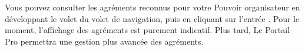 Vous pouvez consulter les agréments reconnus pour votre Pouvoir organisateur en développant le volet  du volet de navigation, puis en cliquant sur l'entrée . Pour le moment, l'affichage des agréments est purement indicatif. Plus tard, Le Portail Pro permettra une gestion plus avancée des agréments.